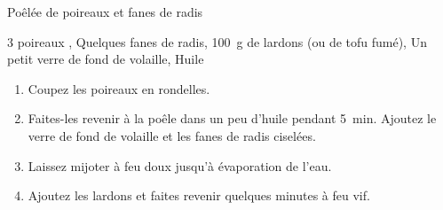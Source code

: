 \begin{recette}{Poêlée de poireaux et fanes de radis}
  \begin{ingredients}  
    3 poireaux \sep
    Quelques fanes de radis\sep
    100~g de lardons (ou de tofu fumé)\sep
    Un petit verre de fond de volaille\sep
    Huile
  \end{ingredients}
  
	\begin{enumerate}
	\item Coupez les poireaux en rondelles.
  \item Faites-les revenir à la poêle dans un peu d'huile pendant 5~min. Ajoutez le verre de fond de volaille et les fanes de radis ciselées.
  \item Laissez mijoter à feu doux jusqu'à évaporation de l'eau.
  \item Ajoutez les lardons et faites revenir quelques minutes à feu vif.
  \end{enumerate}
\end{recette}

